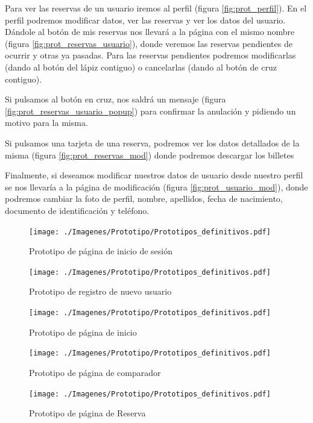 Para ver las reservas de un usuario iremos al perfil (figura
\ref{fig:prot_perfil}). En el perfil podremos modificar datos, ver las reservas
y ver los datos del usuario. Dándole al botón de mis reservas nos llevará a la
página con el mismo nombre (figura \ref{fig:prot_reservas_usuario}), donde
veremos las reservas pendientes de ocurrir y otras ya pasadas. Para las
reservas pendientes podremos modificarlas (dando al botón del lápiz contiguo) o
cancelarlas (dando al botón de cruz contiguo).

Si pulsamos al botón en cruz, nos saldrá un mensaje (figura
\ref{fig:prot_reservas_usuario_popup}) para confirmar la anulación y pidiendo
un motivo para la misma.

Si pulsamos una tarjeta de una reserva, podremos ver los datos detallados de la
misma (figura \ref{fig:prot_reservas_mod}) donde podremos descargar los
billetes

Finalmente, si deseamos modificar nuestros datos de usuario desde nuestro
perfil se nos llevaría a la página de modificación (figura
\ref{fig:prot_usuario_mod}), donde podremos cambiar la foto de perfil, nombre,
apellidos, fecha de nacimiento, documento de identificación y teléfono.

\begin{figure}[H]
      \centering
      \texttt{[image: ./Imagenes/Prototipo/Prototipos\_definitivos.pdf]}
      \caption{Prototipo de página de inicio de sesión}
      \label{fig:prot_ses}
\end{figure}

\begin{figure}[H]
      \centering
      \texttt{[image: ./Imagenes/Prototipo/Prototipos\_definitivos.pdf]}
      \caption{Prototipo de registro de nuevo usuario}
      \label{fig:prot_reg}
\end{figure}

\begin{figure}[H]
      \centering
      \texttt{[image: ./Imagenes/Prototipo/Prototipos\_definitivos.pdf]}
      \caption{Prototipo de página de inicio}
      \label{fig:prot_inicio}
\end{figure}

\begin{figure}[H]
      \centering
      \texttt{[image: ./Imagenes/Prototipo/Prototipos\_definitivos.pdf]}
      \caption{Prototipo de página de comparador}
      \label{fig:prot_comp}
\end{figure}

\begin{figure}[H]
      \centering
      \texttt{[image: ./Imagenes/Prototipo/Prototipos\_definitivos.pdf]}
      \caption{Prototipo de página de Reserva}
      \label{fig:prot_reser}
\end{figure}

